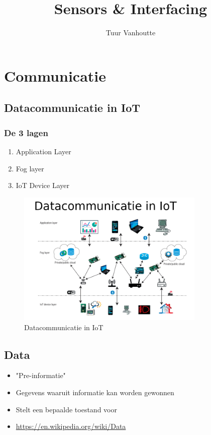 \documentclass{article}
\begin{document}
\begin{titlepage}
    \author{Tuur Vanhoutte}
    \title{Sensors \& Interfacing}
\end{titlepage}

\maketitle
\newpage
\tableofcontents
\newpage


\section {Communicatie}
\subsection{Datacommunicatie in IoT}
\subsubsection{De 3 lagen}
\begin{enumerate}
    \item Application Layer
    \item Fog layer
    \item IoT Device Layer
\end{enumerate}


\begin{figure}[H]
    \centering
    \includegraphics[width=0.8\textwidth]{Screenshot_20200210_120010.png}
    \caption{Datacommunicatie in IoT}
\end{figure}



\subsection{Data}
\begin{itemize}
    \item "Pre-informatie"
    \item Gegevens waaruit informatie kan worden gewonnen
    \item Stelt een bepaalde toestand voor
    \item \url{https://en.wikipedia.org/wiki/Data}
\end{itemize}
\end{document}
